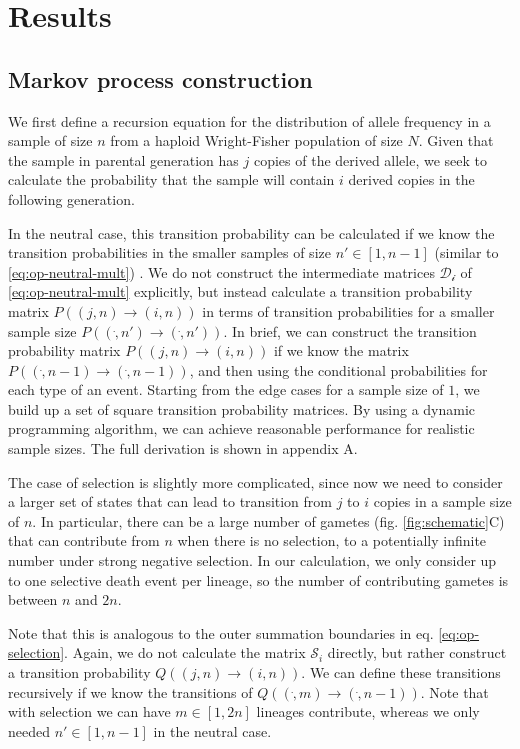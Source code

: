 \documentclass[review]{elsarticle}
\newcommand{\ra}{\rightarrow}
\begin{document}
\section{Results}
\label{sec:results}

\subsection{Markov process construction}
\label{subsec:markov}

We first define a recursion equation for the distribution of allele frequency in a sample of size
$n$ from a haploid Wright-Fisher population of size $N$. Given that the sample in parental generation
has $j$ copies of the derived allele, we seek to calculate the probability that the sample
will contain $i$ derived copies in the following generation.

In the neutral case, this transition probability can be calculated if we know the transition
probabilities in the smaller samples of size $n' \in [1, n-1]$ (similar to
\eqref{eq:op-neutral-mult}) \cite{BhaskarEtAl2014}. We do not construct the intermediate matrices
$\mathcal{D_i}$ of \eqref{eq:op-neutral-mult} explicitly, but instead calculate a transition
probability matrix $P((j,n)\ra(i,n))$ in terms of transition probabilities for a smaller sample size
$P((\dot,n')\ra(\dot,n'))$. In brief, we can construct the transition probability matrix
$P((j,n)\ra(i,n))$ if we know the matrix $P((\dot,n-1)\ra(\dot,n-1))$, and then using the
conditional probabilities for each type of an event. Starting from the edge cases for a sample size
of $1$, we build up a set of square transition probability matrices. By using a dynamic programming
algorithm, we can achieve reasonable performance for realistic sample sizes. The full derivation is
shown in appendix A.

The case of selection is slightly more complicated, since now we need to consider a larger set of
states that can lead to transition from $j$ to $i$ copies in a sample size of $n$. In particular,
there can be a large number of gametes (fig. \ref{fig:schematic}C) that can contribute from $n$ when
there is no selection, to a potentially infinite number under strong negative selection. In our
calculation, we only consider up to one selective death event per lineage, so the number of
contributing gametes is between $n$ and $2n$.

Note that this is analogous to the outer summation boundaries in eq. \eqref{eq:op-selection}. Again,
we do not calculate the matrix $\mathcal{S}_i$ directly, but rather construct a transition
probability $Q((j,n)\ra(i,n))$. We can define these transitions recursively if we know the
transitions of $Q((\dot,m)\ra(\dot,n-1))$. Note that with selection we can have $m \in [1, 2n]$
lineages contribute, whereas we only needed $n' \in [1, n-1]$ in the neutral case.
\end{document}
